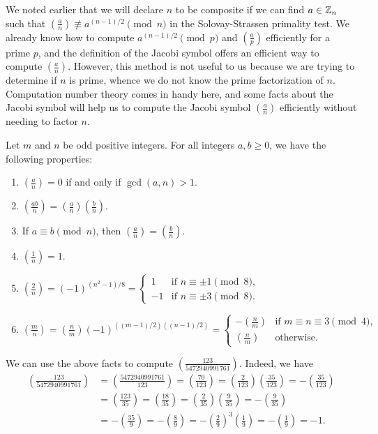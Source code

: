 We noted earlier that we will declare $n$ to be composite if we can find $a \in \mathbb{Z}_n$ such that 
$\left(\frac an\right) \not\equiv a^{(n-1)/2} \pmod n$ in the Solovay-Strassen primality test. We already 
know how to compute $a^{(n-1)/2} \pmod p$ and $(\frac ap)$ efficiently for a prime $p$, and 
the definition of the Jacobi symbol offers an efficient way to compute $\left(\frac an\right)$. 
However, this method is not useful to us because we are trying to determine if $n$ is prime, 
whence we do not know the prime factorization of $n$. Computation number theory comes in 
handy here, and some facts about the Jacobi symbol will help us to compute the Jacobi symbol
$\left(\frac an\right)$ efficiently without needing to factor $n$.

\begin{prop}
Let $m$ and $n$ be odd positive integers. For all integers $a, b \geq 0$, we have the following properties:
\begin{enumerate}[(1)]
    \item $\left(\frac an\right) = 0$ if and only if $\gcd(a, n) > 1$. 
    \item $\left(\frac {ab}n\right) = \left(\frac an\right)\left(\frac bn\right)$. 
    \item If $a \equiv b \pmod n$, then $\left(\frac an\right) = \left(\frac bn\right)$. 
    \item $\left(\frac1n\right) = 1$. 
    \item $\left(\frac2n\right) = (-1)^{(n^2-1)/8} = \begin{cases} 1 & \text{if } n \equiv \pm1 \pmod 8, \\ -1 & \text{if } n \equiv \pm3 \pmod 8. \end{cases}$
    \item $\left(\frac mn\right) = \left(\frac nm\right) (-1)^{((m-1)/2)((n-1)/2)} = \begin{cases} -\left(\frac nm\right) & \text{if } m\equiv n \equiv 3 \pmod 4, \\ \left(\frac nm\right) & \text{otherwise.} \end{cases}$
\end{enumerate}
\end{prop}

\begin{exmp}
We can use the above facts to compute $\left(\frac{123}{5472940991761}\right)$. Indeed, we have 
\begin{align*}
    \left( \frac{123}{5472940991761} \right) &= 
    \left( \frac{5472940991761}{123} \right) = \left( \frac{70}{123} \right) 
    = \left( \frac{2}{123} \right) \left( \frac{35}{123} \right) = -\left( \frac{35}{123} \right) \\
    &= \left( \frac{123}{35} \right) = \left( \frac{18}{35} \right) = \left( \frac{2}{35} \right)
    \left( \frac{9}{35} \right) = -\left( \frac{9}{35} \right) \\
    &= -\left( \frac{35}{9} \right) = -\left( \frac{8}{9} \right) = -\left( \frac{2}{9} \right)^{\!3}
    \left( \frac{1}{9} \right) = -\left( \frac{1}{9} \right) = -1. 
\end{align*}
\end{exmp}

